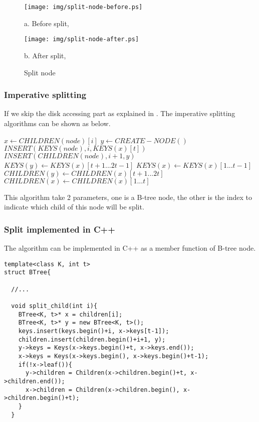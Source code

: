 \documentclass{article}
\begin{document}
\begin{figure}[htbp]
       \begin{center}
       	  \texttt{[image: img/split-node-before.ps]}

          a. Before split,

          \texttt{[image: img/split-node-after.ps]}

          b. After split, 
        \caption{Split node} \label{fig:node-split}
       \end{center}
\end{figure}

\subsubsection{Imperative splitting}
If we skip the disk accessing part as explained in \cite{CLRS}. The 
imperative splitting algorithms can be shown as below.

\begin{algorithmic}[1]
  \State $x \leftarrow CHILDREN(node)[i]$
  \State $y \leftarrow CREATE-NODE()$
  \State $INSERT(KEYS(node), i, KEYS(x)[t])$
  \State $INSERT(CHILDREN(node), i+1, y)$
  \State $KEYS(y) \leftarrow KEYS(x)[t+1 ... 2t-1]$
  \State $KEYS(x) \leftarrow KEYS(x)[1 ... t-1]$
    \State $CHILDREN(y) \leftarrow CHILDREN(x)[t+1 ... 2t]$
    \State $CHILDREN(x) \leftarrow CHILDREN(x)[1 ... t]$
  \EndIf
\EndProcedure
\end{algorithmic}

This algorithm take 2 parameters, one is a B-tree node, the other
is the index to indicate which child of this node will be split.

\subsubsection*{Split implemented in C++}
The algorithm can be implemented in C++ as a member function of
B-tree node.

\lstset{language=C++}
\begin{lstlisting}
template<class K, int t>
struct BTree{

  //...

  void split_child(int i){
    BTree<K, t>* x = children[i];
    BTree<K, t>* y = new BTree<K, t>();
    keys.insert(keys.begin()+i, x->keys[t-1]);
    children.insert(children.begin()+i+1, y);
    y->keys = Keys(x->keys.begin()+t, x->keys.end());
    x->keys = Keys(x->keys.begin(), x->keys.begin()+t-1);
    if(!x->leaf()){
      y->children = Children(x->children.begin()+t, x->children.end());
      x->children = Children(x->children.begin(), x->children.begin()+t);
    }
  }
\end{lstlisting}
\end{document}
